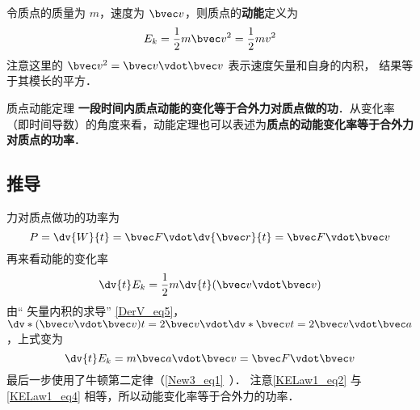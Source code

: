 

令质点的质量为 $m$，速度为 $\bvec v$，则质点的\textbf{动能}定义为
\begin{equation}
E_k = \frac12 m\bvec v^2 = \frac12 mv^2
\end{equation}
注意这里的 $\bvec v^2 = \bvec v \vdot \bvec v$ 表示速度矢量和自身的内积， 结果等于其模长的平方．

\begin{theorem}{质点动能定理}
\textbf{一段时间内质点动能的变化等于合外力对质点做的功}．从变化率（即时间导数）的角度来看，动能定理也可以表述为\textbf{质点的动能变化率等于合外力对质点的功率}．
\end{theorem}

\subsection{推导}
力对质点做功的功率为
\begin{equation}\label{KELaw1_eq2}
P = \dv{W}{t} =  \bvec F\vdot \dv{\bvec r}{t} = \bvec F\vdot\bvec v
\end{equation}
再来看动能的变化率
\begin{equation}
\dv{t} E_k = \frac12 m\dv{t} (\bvec v\vdot\bvec v)
\end{equation}
由“ 矢量内积的求导” \autoref{DerV_eq5}，$\dv*{(\bvec v\vdot\bvec v)}{t} = 2\bvec v\vdot \dv*{\bvec v}{t} = 2\bvec v\vdot\bvec a$，上式变为
\begin{equation}\label{KELaw1_eq4}
\dv{t} E_k = m\bvec a\vdot\bvec v = \bvec F\vdot\bvec v
\end{equation}
最后一步使用了牛顿第二定律（\autoref{New3_eq1}~）． 注意\autoref{KELaw1_eq2} 与\autoref{KELaw1_eq4} 相等，所以动能变化率等于合外力的功率．